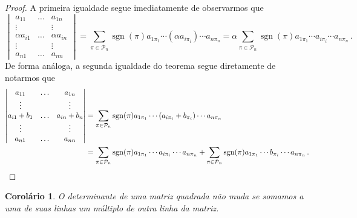 \documentclass[12pt,a4paper]{report}
\newcommand{\mc}{\mathcal}
\newtheorem{cor}[thm]{Corolário}
\DeclareMathOperator{\sgn}{sgn}
\begin{document}
\begin{proof}
  A primeira igualdade segue imediatamente de observarmos que
  $$\begin{vmatrix}
    a_{11}&\ldots& a_{1n}\\
    \vdots&&\vdots\\
    \alpha a_{i1}&\ldots&\alpha a_{in}\\
    \vdots&&\vdots\\
    a_{n1}&\ldots&a_{nn}
  \end{vmatrix}=\sum_{\pi\in\mc P_n}\sgn(\pi)a_{1\pi_1}\cdots (\alpha a_{i\pi_i})\cdots a_{n\pi_n}
  =\alpha\sum_{\pi\in\mc P_n}\sgn(\pi)a_{1\pi_1}\cdots a_{i\pi_i}\cdots a_{n\pi_n}\,.$$
  De forma análoga, a segunda igualdade do teorema segue diretamente de notarmos que
  \begin{equation*}
    \begin{split}
      \begin{vmatrix}
        a_{11}&\ldots& a_{1n}\\
        \vdots&&\vdots\\
        a_{i1}+b_1&\ldots&a_{in}+b_n\\
        \vdots&&\vdots\\
        a_{n1}&\ldots&a_{nn}
      \end{vmatrix}&=\sum_{\pi\in\mc P_n}\sgn(\pi)a_{1\pi_1}\cdots (a_{i\pi_i}+b_{\pi_i})\cdots a_{n\pi_n}\\
      &=\sum_{\pi\in\mc P_n}\sgn(\pi)a_{1\pi_1}\cdots a_{i\pi_i}\cdots a_{n\pi_n}+\sum_{\pi\in\mc P_n}\sgn(\pi)a_{1\pi_1}\cdots b_{\pi_i}\cdots a_{n\pi_n}\,.\qedhere
    \end{split}
  \end{equation*}
\end{proof}

\begin{cor}
  O determinante de uma matriz quadrada não muda se somamos a uma de suas linhas um múltiplo de outra linha da matriz.
\end{cor}
\end{document}

